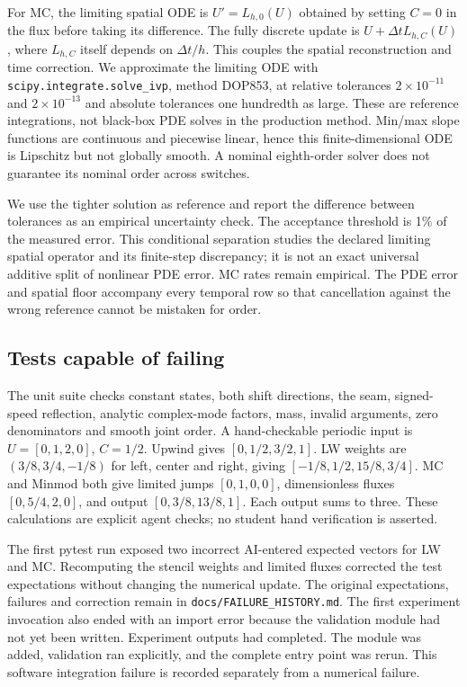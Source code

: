 For MC, the limiting spatial ODE is $U'=L_{h,0}(U)$ obtained by setting $C=0$ in the flux before taking its difference. The fully discrete update is $U+\Delta t L_{h,C}(U)$, where $L_{h,C}$ itself depends on $\Delta t/h$. This couples the spatial reconstruction and time correction. We approximate the limiting ODE with \texttt{scipy.integrate.solve\_ivp}, method DOP853, at relative tolerances $2\times10^{-11}$ and $2\times10^{-13}$ and absolute tolerances one hundredth as large. These are reference integrations, not black-box PDE solves in the production method. Min/max slope functions are continuous and piecewise linear, hence this finite-dimensional ODE is Lipschitz but not globally smooth. A nominal eighth-order solver does not guarantee its nominal order across switches.

We use the tighter solution as reference and report the difference between tolerances as an empirical uncertainty check. The acceptance threshold is 1\% of the measured error. This conditional separation studies the declared limiting spatial operator and its finite-step discrepancy; it is not an exact universal additive split of nonlinear PDE error. MC rates remain empirical. The PDE error and spatial floor accompany every temporal row so that cancellation against the wrong reference cannot be mistaken for order.

\subsection{Tests capable of failing}
The unit suite checks constant states, both shift directions, the seam, signed-speed reflection, analytic complex-mode factors, mass, invalid arguments, zero denominators and smooth joint order. A hand-checkable periodic input is $U=[0,1,2,0]$, $C=1/2$. Upwind gives $[0,1/2,3/2,1]$. LW weights are $(3/8,3/4,-1/8)$ for left, center and right, giving $[-1/8,1/2,15/8,3/4]$. MC and Minmod both give limited jumps $[0,1,0,0]$, dimensionless fluxes $[0,5/4,2,0]$, and output $[0,3/8,13/8,1]$. Each output sums to three. These calculations are explicit agent checks; no student hand verification is asserted.

The first pytest run exposed two incorrect AI-entered expected vectors for LW and MC. Recomputing the stencil weights and limited fluxes corrected the test expectations without changing the numerical update. The original expectations, failures and correction remain in \texttt{docs/FAILURE\_HISTORY.md}. The first experiment invocation also ended with an import error because the validation module had not yet been written. Experiment outputs had completed. The module was added, validation ran explicitly, and the complete entry point was rerun. This software integration failure is recorded separately from a numerical failure.

